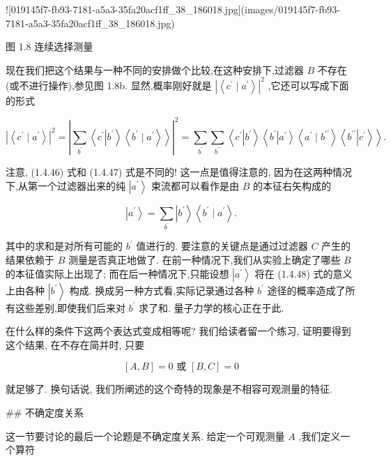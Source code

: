 \documentclass[lang=cn,newtx,10pt,scheme=chinese,thmcnt=section]{elegantbook}
\begin{document}
![019145f7-fb93-7181-a5a3-35fa20acf1ff_38_186018.jpg](images/019145f7-fb93-7181-a5a3-35fa20acf1ff_38_186018.jpg)

图 1.8 连续选择测量

现在我们把这个结果与一种不同的安排做个比较,在这种安排下,过滤器 $B$ 不存在 (或不进行操作),参见图 1.8b. 显然,概率刚好就是 ${\left| \left\langle {c}^{\prime } \mid {a}^{\prime }\right\rangle \right| }^{2}$ ,它还可以写成下面的形式

$$
{\left| \left\langle {c}^{\prime } \mid {a}^{\prime }\right\rangle \right| }^{2} = {\left| \mathop{\sum }\limits_{{b}^{\prime }}\left\langle {c}^{\prime }\left| {b}^{\prime }\right\rangle \left\langle {b}^{\prime } \mid {a}^{\prime }\right\rangle \right\rangle \right| }^{2} = \mathop{\sum }\limits_{{b}^{\prime }}\mathop{\sum }\limits_{{b}^{\prime \prime }}\left\langle {{c}^{\prime }\left| {b}^{\prime }\right\rangle \left\langle {{b}^{\prime }\left| {a}^{\prime }\right\rangle \left\langle {{a}^{\prime } \mid {b}^{\prime \prime }}\right\rangle \left\langle {b}^{\prime \prime }\right| {c}^{\prime }}\right\rangle }\right\rangle . \tag{1.4.47}
$$

注意, (1.4.46) 式和 (1.4.47) 式是不同的! 这一点是值得注意的, 因为在这两种情况下,从第一个过滤器出来的纯 $\left| {a}^{\prime }\right\rangle$ 束流都可以看作是由 $B$ 的本征右矢构成的

$$
\left| {a}^{\prime }\right\rangle = \mathop{\sum }\limits_{{b}^{\prime }}\left| {b}^{\prime }\right\rangle \left\langle {{b}^{\prime } \mid {a}^{\prime }}\right\rangle . \tag{1.4.48}
$$

其中的求和是对所有可能的 ${b}^{\prime }$ 值进行的. 要注意的关键点是通过过滤器 $C$ 产生的结果依赖于 $B$ 测量是否真正地做了. 在前一种情况下,我们从实验上确定了哪些 $B$ 的本征值实际上出现了; 而在后一种情况下,只能设想 $\left| {a}^{\prime }\right\rangle$ 将在 (1.4.48) 式的意义上由各种 $\left| {b}^{\prime }\right\rangle$ 构成. 换成另一种方式看,实际记录通过各种 ${b}^{\prime }$ 途径的概率造成了所有这些差别,即使我们后来对 ${b}^{\prime }$ 求了和. 量子力学的核心正在于此.

在什么样的条件下这两个表达式变成相等呢? 我们给读者留一个练习, 证明要得到这个结果, 在不存在简并时, 只要

$$
\left\lbrack {A, B}\right\rbrack = 0\text{ 或 }\left\lbrack {B, C}\right\rbrack = 0 \tag{1.4.49}
$$

就足够了. 换句话说, 我们所阐述的这个奇特的现象是不相容可观测量的特征.

## 不确定度关系

这一节要讨论的最后一个论题是不确定度关系. 给定一个可观测量 $A$ ,我们定义一个算符
\end{document}
